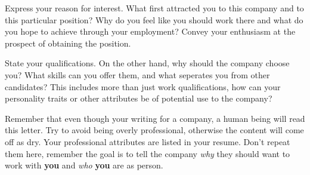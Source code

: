 \documentclass[letterpaper]{easyCover}
\begin{document}

\small{}


\begin{main}[14pt]
Express your reason for interest.  What first attracted you to this company and to this particular position?
Why do you feel like you should work there and what do you hope to achieve through your employment?
Convey your enthusiasm at the prospect of obtaining the position.

State your qualifications.  On the other hand, why should the company choose you?
What skills can you offer them, and what seperates you from other candidates?
This includes more than just work qualifications, how can your personality traits or other attributes
be of potential use to the company?

Remember that even though your writing for a company, a human being will read this letter.
Try to avoid being overly professional, otherwise the content will come off as dry.  Your professional
attributes are listed in your resume.  Don't repeat them here, remember the goal is to tell the company
\textit{why} they should want to work with \textbf{you} and \textit{who} \textbf{you} are as person.

\end{main}
\end{document}
